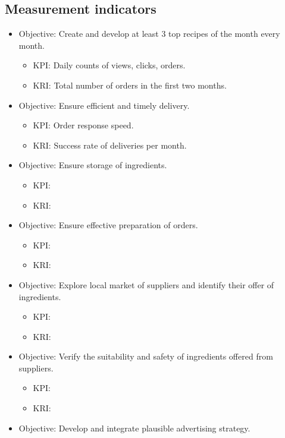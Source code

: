 \documentclass[11pt,a4paper]{article}
\begin{document}
\subsection{Measurement indicators}

\begin{itemize}
    \item Objective: Create and develop at least 3 top recipes of the month every month.
    \begin{itemize}
        \item KPI: Daily counts of views, clicks, orders.
        \item KRI: Total number of orders in the first two months.
    \end{itemize}
    \item Objective: Ensure efficient and timely delivery.
    \begin{itemize}
        \item KPI: Order response speed.
        \item KRI: Success rate of deliveries per month.
    \end{itemize}
    \item Objective: Ensure storage of ingredients.
    \begin{itemize}
        \item KPI: 
        \item KRI: 
    \end{itemize}
    \item Objective: Ensure effective preparation of orders.
    \begin{itemize}
        \item KPI: 
        \item KRI: 
    \end{itemize}
    \item Objective: Explore local market of suppliers and identify their offer of ingredients.
    \begin{itemize}
        \item KPI: 
        \item KRI: 
    \end{itemize}
    \item Objective: Verify the suitability and safety of ingredients offered from suppliers.
    \begin{itemize}
        \item KPI: 
        \item KRI: 
    \end{itemize}
    \item Objective: Develop and integrate plausible advertising strategy.

\end{itemize}
\end{document}
